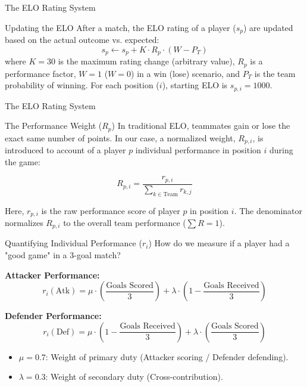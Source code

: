 \documentclass[10pt, aspectratio=169]{beamer}
\begin{document}
\begin{frame}{The ELO Rating System}

\begin{alertblock}{Updating the ELO}
        After a match, the ELO rating of a player ($s_p$) are updated based on the actual outcome vs. expected:
		$$\boxed{s_p \leftarrow s_p + K \cdot R_p \cdot (W - P_T)}$$
		where $K=30$ is the maximum rating change (arbitrary value), $R_p$ is a performance factor, $W=1$ ($W=0$) in a win (lose) scenario, and $P_T$ is the team probability of winning. For each position ($i$), starting ELO is $s_{p, i} = 1000$.
\end{alertblock}
\end{frame}

\begin{frame}{The ELO Rating System}

    
    \begin{alertblock}{The Performance Weight ($R_p$)}
        In traditional ELO, teammates gain or lose the exact same number of points. In our case, a normalized weight, $R_{p, i}$, is introduced to account of a player $p$ individual performance in position $i$ during the game:
    
    $$ R_{p, i} = \frac{r_{p, i}}{\sum_{k \in \text{Team}} r_{k, j}} $$
    
    Here, $r_{p, i}$ is the raw performance score of player $p$ in position $i$. The denominator normalizes $R_{p, i}$ to the overall team performance ($\sum R = 1$).
    \end{alertblock}

\end{frame}



\begin{frame}{Quantifying Individual Performance ($r_i$)}
    How do we measure if a player had a "good game" in a 3-goal match?
    
    \vspace{0.5em}
    \textbf{Attacker Performance:}
    $$ r_i (\text{Atk}) =  \mu \cdot \left(\frac{\text{Goals Scored}}{3} \right) + \lambda \cdot \left( 1- \frac{\text{Goals Received}}{3} \right) $$

    \vspace{0.5em}
    \textbf{Defender Performance:}
    $$ r_i (\text{Def}) = \mu \cdot \left( 1 - \frac{\text{Goals Received}}{3} \right) + \lambda \cdot \left( \frac{\text{Goals Scored}}{3} \right) $$

    \vspace{0.5em}
    \begin{itemize}
        \item $\mu = 0.7$: Weight of primary duty (Attacker scoring / Defender defending).
        \item $\lambda = 0.3$: Weight of secondary duty (Cross-contribution).
    \end{itemize}

\end{frame}
\end{document}
